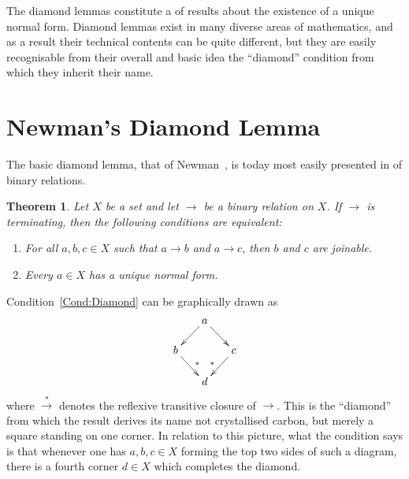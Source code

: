 \documentclass[12pt]{article}
\newtheorem{thm}{Theorem}
\theoremstyle{definition}
\providecommand*{\Dash}{%
   \hspace*{0.166667em}\textemdash\hspace{0.166667em}%
}
\begin{document}
The diamond lemmas constitute a  of results about the existence 
of a unique normal form. Diamond lemmas exist in many diverse areas of 
mathematics, and as a result their technical contents can be quite 
different, but they are easily recognisable from their overall 
 and basic idea\Dash the ``diamond'' condition 
from which they inherit their name.



\section{Newman's Diamond Lemma}

The basic diamond lemma, that of Newman~\cite{Newman}, is today most 
easily presented in  of binary relations.

\begin{thm} \label{S:NDL}
  Let $X$ be a set and let $\rightarrow$ be a binary relation on $X$. 
  If $\rightarrow$ is terminating, then the following conditions are equivalent:
  \begin{enumerate}
    \item \label{Cond:Diamond}
      For all \(a,b,c \in X\) such that \(a \rightarrow b\) and \(a 
      \rightarrow c\), then $b$ and $c$ are joinable.
    \item \label{Cond:UniqueNF}
      Every \(a \in X\) has a unique normal form.
  \end{enumerate}
\end{thm}

Condition~\ref{Cond:Diamond} can be graphically drawn as
$$
  \xymatrix@-2ex{
    & a \ar[dl] \ar[dr] \\
    b \ar[dr]^>>>>{*} & & c \ar[dl]_>>>>{*} \\
    & d
  }
$$
where $\stackrel{*}{\rightarrow}$ denotes the reflexive transitive closure of $\rightarrow$.  This is the ``diamond'' from which the result derives its 
name\Dash not crystallised carbon, but merely a square standing on one 
corner. In relation to this picture, what the condition says is that 
whenever one has \(a,b,c \in X\) forming the top two sides of such a 
diagram, there is a fourth corner \(d \in X\) which completes the 
diamond.

\medskip
\end{document}
